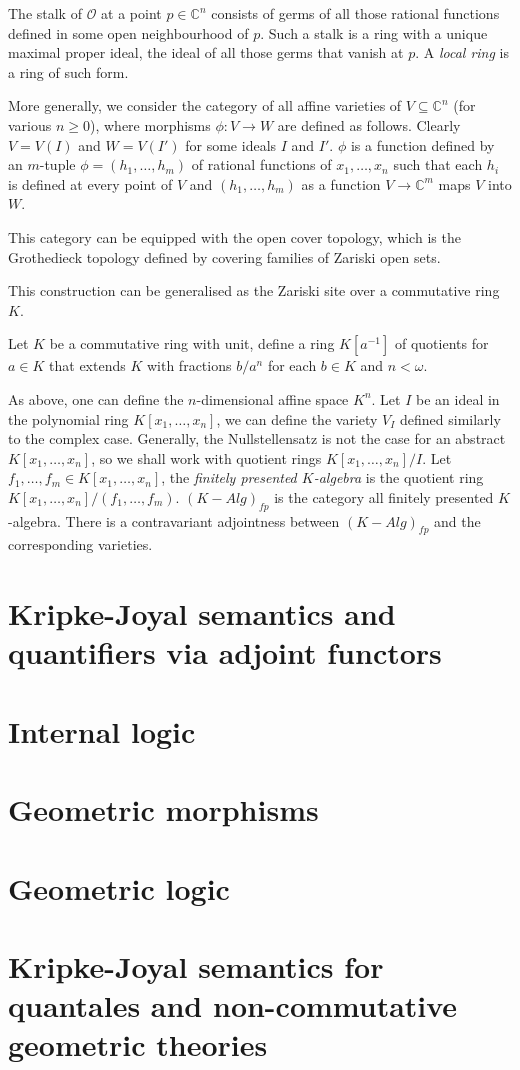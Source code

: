 \documentclass[a4paper]{article}
\theoremstyle{defin}
\theoremstyle{theorem}
\theoremstyle{claim}
\theoremstyle{prop}
\theoremstyle{lemma}
\theoremstyle{fact}
\theoremstyle{ex}
\theoremstyle{col}
\begin{document}
The stalk of $\mathcal{O}$ at a point $p \in \mathbb{C}^n$ consists of germs of all those rational functions defined in some open neighbourhood of $p$. Such a stalk is a ring with a unique maximal proper ideal, the ideal of all those germs that vanish at $p$. A \emph{local ring} is a ring of such form.

More generally, we consider the category of all affine varieties of $V \subseteq \mathbb{C}^n$ (for various $n \geq 0$), where morphisms $\phi : V \to W$ are defined as follows. Clearly $V = V(I)$ and $W = V(I')$ for some ideals $I$ and $I'$. $\phi$ is a function defined by an $m$-tuple $\phi = (h_1, \dots, h_m)$ of rational functions of $x_1, \dots, x_n$ such that each $h_i$ is defined at every point of $V$ and $(h_1, \dots, h_m)$ as a function $V \to \mathbb{C}^m$ maps $V$ into $W$.

This category can be equipped with the open cover topology, which is the Grothedieck topology defined by covering families of Zariski open sets.

This construction can be generalised as the Zariski site over a commutative ring $K$.

Let $K$ be a commutative ring with unit, define a ring $K[a^{-1}]$ of quotients for $a \in K$ that extends $K$ with fractions $b/a^n$ for each $b \in K$ and $n < \omega$.

As above, one can define the $n$-dimensional affine space $K^n$. Let $I$ be an ideal in the polynomial ring $K[x_1, \dots, x_n]$, we can define the variety $V_I$ defined similarly to the complex case. Generally, the Nullstellensatz is not the case for an abstract $K[x_1, \dots, x_n]$, so we shall work with quotient rings $K[x_1, \dots, x_n]/I$. Let $f_1, \dots, f_m \in K[x_1, \dots, x_n]$, the \emph{finitely presented $K$-algebra} is the quotient ring $K[x_1, \dots, x_n]/(f_1, \dots, f_m)$. $(K - Alg)_{fp}$ is the category all finitely presented $K$-algebra. There is a contravariant adjointness between $(K - Alg)_{fp}$ and the corresponding varieties.

\section{Kripke-Joyal semantics and quantifiers via adjoint functors}

\section{Internal logic}

\section{Geometric morphisms}

\section{Geometric logic}

\section{Kripke-Joyal semantics for quantales and non-commutative geometric theories}
\end{document}

